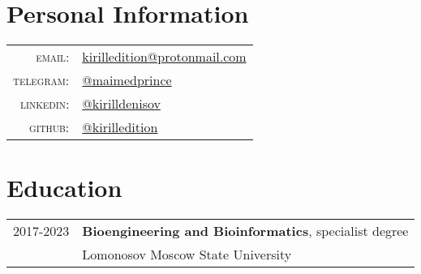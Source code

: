 


\par{\bigskip\par}

\section{Personal Information}

\begin{tabular}{rl}
    \textsc{email:}     & \href{mailto:kirilledition@protonmail.com}{kirilledition@protonmail.com} \\
    \textsc{telegram:}  & \href{https://t.me/maimedprince}{@maimedprince} \\
    \textsc{linkedin:}    & \href{https://www.linkedin.com/in/kirilldenisov/}{@kirilldenisov} \\
    \textsc{github:}    & \href{https://github.com/kirilledition}{@kirilledition} \\
    
\end{tabular}

\section{Education}
\begin{tabular}{rl}	

 \textsc{2017-2023} & \textbf{Bioengineering and Bioinformatics}, specialist degree \normalsize\\
 \textsc{}  & Lomonosov Moscow State University\\

\end{tabular}

